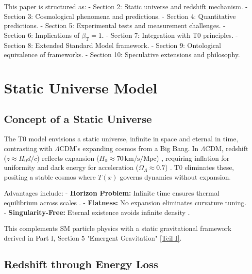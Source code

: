 \documentclass[twocolumn,aps,prl]{revtex4-2}
\newcommand{\Tfield}{T(x)}
\newcommand{\betaT}{\beta_{\text{T}}}
\newcommand{\LCDM}{\Lambda\text{CDM}}
\begin{document}
	This paper is structured as:
	- Section 2: Static universe and redshift mechanism.
	- Section 3: Cosmological phenomena and predictions.
	- Section 4: Quantitative predictions.
	- Section 5: Experimental tests and measurement challenges.
	- Section 6: Implications of \(\betaT = 1\).
	- Section 7: Integration with T0 principles.
	- Section 8: Extended Standard Model framework.
	- Section 9: Ontological equivalence of frameworks.
	- Section 10: Speculative extensions and philosophy.
	
	\section{Static Universe Model}
	\label{sec:static_universe}
	
	\subsection{Concept of a Static Universe}
	\label{subsec:static_concept}
	
	The T0 model envisions a static universe, infinite in space and eternal in time, contrasting with \(\LCDM\)'s expanding cosmos from a Big Bang. In \(\LCDM\), redshift (\(z \approx H_0 d / c\)) reflects expansion (\(H_0 \approx 70 \, \text{km/s/Mpc}\)) \cite{Planck2020}, requiring inflation for uniformity and dark energy for acceleration (\(\Omega_{\Lambda} \approx 0.7\)) \cite{Riess1998}. T0 eliminates these, positing a stable cosmos where \(\Tfield\) governs dynamics without expansion.
	
	Advantages include:
	- \textbf{Horizon Problem:} Infinite time ensures thermal equilibrium across scales \cite{pascher_messdifferenzen_2025}.
	- \textbf{Flatness:} No expansion eliminates curvature tuning.
	- \textbf{Singularity-Free:} Eternal existence avoids infinite density \cite{pascher_perspective_2025}.
	
	This complements SM particle physics with a static gravitational framework derived in Part I, Section 5 "Emergent Gravitation" \href{https://github.com/jpascher/T0-Time-Mass-Duality/tree/main/2/pdf/English/QMRelTimeMassPart1En.pdf}{[Teil I]}.
	
	\subsection{Redshift through Energy Loss}
	\label{subsec:redshift_energy_loss}
	
\end{document}
